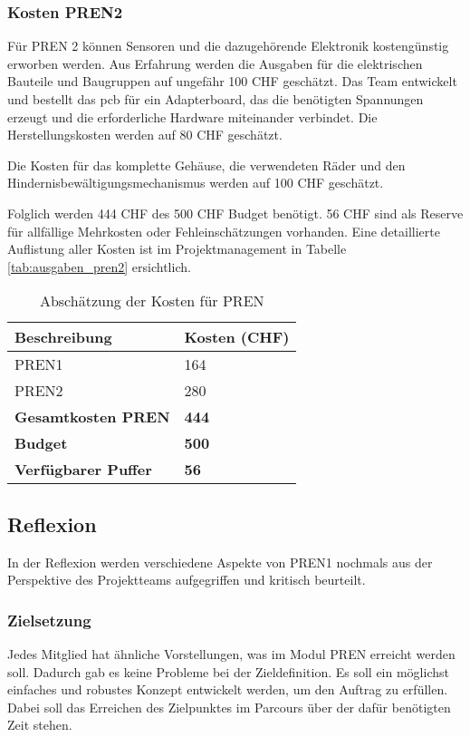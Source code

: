 \documentclass[../main.tex]{subfiles}
\begin{document}
\subsubsection{Kosten PREN2}
Für PREN 2 können
Sensoren und die dazugehörende Elektronik kostengünstig erworben werden. Aus Erfahrung werden die Ausgaben für die elektrischen Bauteile und Baugruppen auf ungefähr 100 CHF geschätzt. Das Team entwickelt und bestellt das \acrshort{pcb} für ein Adapterboard, das die benötigten Spannungen erzeugt und die erforderliche Hardware miteinander verbindet. Die Herstellungskosten werden auf 80 CHF geschätzt.

Die Kosten für das komplette Gehäuse, die verwendeten Räder und den Hindernisbewältigungsmechanismus werden auf 100 CHF geschätzt.

Folglich werden 444 CHF des 500 CHF Budget benötigt. 56 CHF sind als Reserve für allfällige Mehrkosten oder Fehleinschätzungen vorhanden. Eine detaillierte Auflistung aller Kosten ist im Projektmanagement in Tabelle \ref{tab:ausgaben_pren2} ersichtlich.

\begin{table}[h!]
    \centering
    \begin{tabular}{|p{5cm}|p{3cm}|}
        \hline
        \textbf{Beschreibung} & \textbf{Kosten (CHF)} \\
        \hline
        PREN1 & 164 \\
        \hline
        PREN2 & 280 \\
        \hline
        \textbf{Gesamtkosten PREN} & \textbf{444} \\
        \hline
        \textbf{Budget} & \textbf{500} \\
        \hline
        \textbf{Verfügbarer Puffer} & \textbf{56} \\
        \hline
    \end{tabular}
    \caption{Abschätzung der Kosten für PREN}
    \label{tab:kostenuebersicht}
\end{table}

\subsection{Reflexion}
In der Reflexion werden verschiedene Aspekte von PREN1 nochmals aus der Perspektive des Projektteams aufgegriffen und kritisch beurteilt.

\subsubsection{Zielsetzung}
Jedes Mitglied hat ähnliche Vorstellungen, was im Modul PREN erreicht werden soll. Dadurch gab es keine Probleme bei der Zieldefinition. Es soll ein möglichst einfaches und robustes Konzept entwickelt werden, um den Auftrag zu erfüllen. Dabei soll das Erreichen des Zielpunktes im Parcours über der dafür benötigten Zeit stehen.
\end{document}
